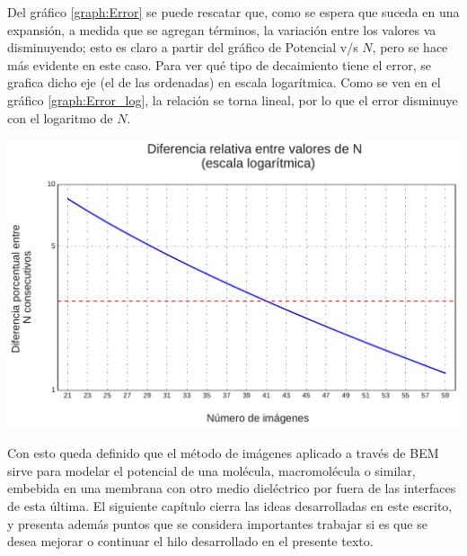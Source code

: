 \documentclass[12pt, oneside, numbers, spanish]{ezthesis}
\numberwithin{equation}{section}
\begin{document}
\noindent
Del gráfico \ref{graph:Error} se puede rescatar que, como se espera que suceda en una expansión, a medida que se agregan términos, la variación entre los valores va disminuyendo; esto es claro a partir del gráfico de Potencial v/s $N$, pero se hace más evidente en este caso. Para ver qué tipo de decaimiento tiene el error, se grafica dicho eje (el de las ordenadas) en escala logarítmica. Como se ven en el gráfico \ref{graph:Error_log}, la relación se torna lineal, por lo que el error disminuye con el logaritmo de $N$.
\begin{graph}[h]
	\centering
	\includegraphics[scale = 0.5]{./Figures/Error_log}
	\caption{}\label{graph:Error_log}
\end{graph}
Con esto queda definido que el método de imágenes aplicado a través de BEM sirve para modelar el potencial de una molécula, macromolécula o similar, embebida en una membrana con otro medio dieléctrico por fuera de las interfaces de esta última. El siguiente capítulo cierra las ideas desarrolladas en este escrito, y presenta además puntos que se considera importantes trabajar si es que se desea mejorar o continuar el hilo desarrollado en el presente texto.
\end{document}
